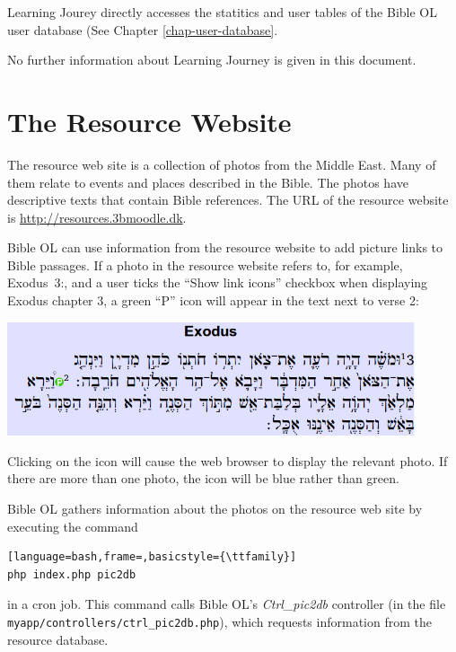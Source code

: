 \documentclass[11pt,oneside,a4paper]{memoir}
\newcommand*{\bibleref}[3]{#1~#2\thinspace:\thinspace#3}
\begin{document}
Learning Jourey directly accesses the statitics and user tables of the Bible OL user database (See
Chapter \ref{chap-user-database}.

No further information about Learning Journey is given in this document.


\section{The Resource Website}\label{sec-resource-web}

The resource web site is a collection of photos from the Middle East. Many of them relate to events
and places described in the Bible. The photos have descriptive texts that contain Bible references.
The URL of the resource website is \url{http://resources.3bmoodle.dk}.

Bible OL can use information from the resource website to add picture links to Bible passages. If a
photo in the resource website refers to, for example, \bibleref{Exodus}{3}{2}, and a user ticks the
``Show link icons'' checkbox when displaying Exodus chapter 3, a green ``P'' icon will appear in the
text next to verse 2:

\begin{center}
\includegraphics[width=0.9\textwidth]{exodus3.png}
\end{center}

Clicking on the icon will cause the web browser to display the relevant photo. If there are more
than one photo, the icon will be blue rather than green.

Bible OL gathers information about the photos on the resource web site by executing the command

\begin{lstlisting}[language=bash,frame=,basicstyle={\ttfamily}]
php index.php pic2db
\end{lstlisting}

\noindent
in a cron job. This command calls Bible OL's \emph{Ctrl\_pic2db} controller (in the file
\texttt{myapp/\allowbreak{}controllers/\allowbreak{}ctrl\_pic2db.php}), which requests information from the resource database.
\end{document}
